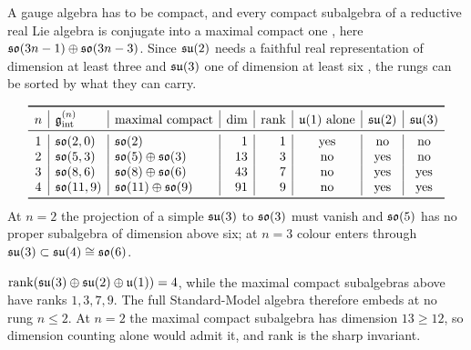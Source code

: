 A gauge algebra has to be compact, and every compact subalgebra of a reductive real Lie algebra is conjugate into a maximal compact
one \cite{Knapp,Helgason}, here $\mathfrak{so}(3n-1)\oplus\mathfrak{so}(3n-3)$. Since $\mathfrak{su}(2)$ needs a faithful real representation of dimension at least
three and $\mathfrak{su}(3)$ one of dimension at least six \cite{GoodmanWallach}, the rungs can be sorted by what they can carry.

\begin{theorem}
\label{thm:census}
\[
\begin{array}{c|l|l|r|r|c|c|c}
\toprule
n & \gint^{(n)} & \text{maximal compact} & \dim & \text{rank} & \uu1\ \text{alone} & \su2 & \su3\\
\midrule
1 & \so{2,0} & \so2 & 1 & 1 & \text{yes} & \text{no} & \text{no}\\
2 & \so{5,3} & \so5\oplus\so3 & 13 & 3 & \text{no} & \text{yes} & \text{no}\\
3 & \so{8,6} & \so8\oplus\so6 & 43 & 7 & \text{no} & \text{yes} & \text{yes}\\
4 & \so{11,9} & \so{11}\oplus\so9 & 91 & 9 & \text{no} & \text{yes} & \text{yes}\\
\bottomrule
\end{array}
\]
At $n=2$ the projection of a simple $\mathfrak{su}(3)$ to $\mathfrak{so}(3)$ must vanish and $\mathfrak{so}(5)$ has no proper subalgebra of dimension above six; at
$n=3$ colour enters through $\mathfrak{su}(3)\subset\mathfrak{su}(4)\cong\mathfrak{so}(6)$.
\end{theorem}

\begin{lemma}
\label{lem:rank}
$\operatorname{rank}(\mathfrak{su}(3)\oplus\mathfrak{su}(2)\oplus\mathfrak{u}(1))=4$, while the maximal compact subalgebras above have ranks $1,3,7,9$. The full Standard-Model
algebra therefore embeds at no rung $n\le2$. At $n=2$ the maximal compact subalgebra has dimension $13\ge12$, so dimension counting
alone would admit it, and rank is the sharp invariant.
\end{lemma}

